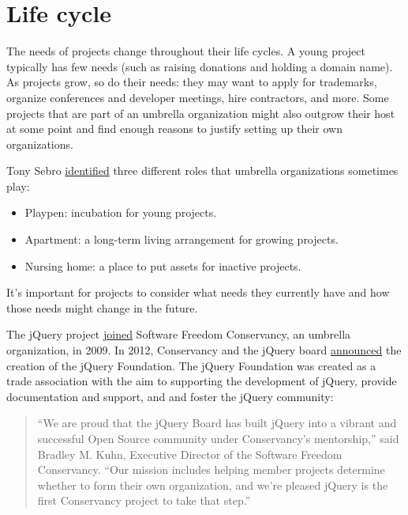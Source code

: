 


\chapter{Life cycle}

The needs of projects change throughout their life cycles.  A young project typically has few needs (such as raising donations and holding a domain name).  As projects grow, so do their needs: they may want to apply for trademarks, organize conferences and developer meetings, hire contractors, and more.  Some projects that are part of an umbrella organization might also outgrow their host at some point and find enough reasons to justify setting up their own organizations.

Tony Sebro \href{https://lwn.net/Articles/548542/}{identified} three different roles that umbrella organizations sometimes play:

\begin{itemize}

\item Playpen: incubation for young projects.

\item Apartment: a long-term living arrangement for growing projects.

\item Nursing home: a place to put assets for inactive projects.

\end{itemize}

It's important for projects to consider what needs they currently have and how those needs might change in the future.

\begin{kaobox}[frametitle=jQuery and the jQuery Foundation]

The jQuery project \href{https://sfconservancy.org/news/2009/nov/30/jQuery-joins/}{joined} Software Freedom Conservancy, an umbrella organization, in 2009.  In 2012, Conservancy and the jQuery board \href{https://sfconservancy.org/news/2012/mar/06/jQuery-Foundation/}{announced} the creation of the jQuery Foundation.  The jQuery Foundation was created as a trade association with the aim to supporting the development of jQuery, provide documentation and support, and and foster the jQuery community:

\begin{quote}

``We are proud that the jQuery Board has built jQuery into a vibrant and successful Open Source community under Conservancy's mentorship,'' said Bradley M. Kuhn, Executive Director of the Software Freedom Conservancy. ``Our mission includes helping member projects determine whether to form their own organization, and we're pleased jQuery is the first Conservancy project to take that step.''

\end{quote}

\end{kaobox}

